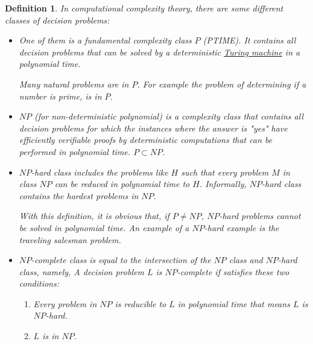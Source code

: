 \documentclass[12pt]{article}
\theoremstyle{slplain}
\newtheorem{defi}{Definition}
\begin{document}
\begin{defi}
In computational complexity theory, there are some different classes of decision problems:

\begin{itemize}
\item One of them is a fundamental complexity class $P$ (PTIME). It contains all decision problems that can be solved by a deterministic \href{https://en.wikipedia.org/wiki/Turing_machine}{Turing machine}\cite{turing} in a polynomial time. 

Many natural problems are in $P$. For example the problem of determining if a number is prime, is in $P$\cite{manindra}.

\item $NP$ (for non-deterministic polynomial) is a complexity class that contains all decision problems for which the instances where the answer is "yes" have efficiently verifiable proofs by deterministic computations that can be performed in polynomial time. $P\subset NP$.

\item $NP$-hard class includes the problems like $H$ such that every problem $M$ in class $NP$ can be reduced in polynomial time to $H$. Informally, $NP$-hard class contains the hardest problems in $NP$. 

With this definition, it is obvious that, if $P \not= NP$, $NP$-hard problems cannot be solved in polynomial time. An example of a $NP$-hard example is the traveling salesman problem.\cite{lawler}

\item $NP$-complete class is equal to the intersection of the $NP$ class and $NP$-hard class, namely, A decision problem $L$ is $NP$-complete if satisfies these two conditions:
\begin{enumerate}
\item Every problem in $NP$ is reducible to $L$ in polynomial time that means $L$ is $NP$-hard.

\item $L$ is in $NP$.
\end{enumerate}
\end{itemize}
\end{defi}
\end{document}
